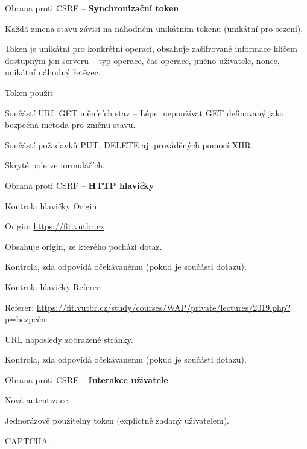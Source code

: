 \begin{compactitem}
    \item Obrana proti CSRF -- \textbf{Synchronizační token} \begin{compactitem}
        \item Každá zmena stavu závisí na náhodném unikátním tokenu (unikátní pro sezení).
        \item Token je unikátní pro konkrétní operací, obsahuje zašifrované informace klíčem dostupným jen serveru -- typ operace, čas operace, jméno uživatele, nonce, unikátní náhodný řetězec.
        \item Token použit \begin{compactitem}
            \item Součástí URL GET měnících stav -- Lépe: nepoužívat GET definovaný jako bezpečná metoda pro změnu stavu.
            \item Součástí požadavků PUT, DELETE aj. prováděných pomocí XHR.
            \item Skryté pole ve formulářích.
        \end{compactitem}
    \end{compactitem}

    \item Obrana proti CSRF -- \textbf{HTTP hlavičky} \begin{compactitem}
        \item Kontrola hlavičky Origin \begin{compactitem}
            \item Origin: \url{https://fit.vutbr.cz}
            \item Obsahuje origin, ze kterého pochází dotaz.
            \item Kontrola, zda odpovídá očekávanému (pokud je součásti dotazu).
        \end{compactitem}

        \item Kontrola hlavičky Referer \begin{compactitem}
            \item Referer: \url{https://fit.vutbr.cz/study/courses/WAP/private/lectures/2019.php?p=bezpečn}
            \item URL naposledy zobrazené stránky.
            \item Kontrola, zda odpovídá očekávanému (pokud je součásti dotazu).
        \end{compactitem}
    \end{compactitem}

    \item Obrana proti CSRF -- \textbf{Interakce uživatele} \begin{compactitem}
        \item Nová autentizace.
        \item Jednorázově použitelný token (explictně zadaný uživatelem).
        \item CAPTCHA.
    \end{compactitem}
\end{compactitem}

